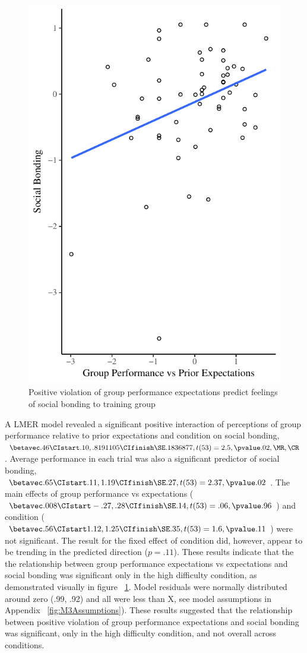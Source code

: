 
\begin{figure}
  \centering
  \includegraphics[width=0.5\linewidth,keepaspectratio] {images/groupPerfExpBondConditionScatter}
  \caption{Positive violation of group performance expectations
 predict feelings of social bonding to training group}
 \label{fig:groupPerfExpBondConditionScatter}
\end{figure}

A LMER model revealed a significant positive interaction of perceptions of group performance relative to prior expectations and condition on social bonding, $\betavec .46 \CIstart .10, .8191105 \CIfinish \SE .1836877, t(53) = 2.5, \pvalue .02, \MR , \CR $.  Average performance in each trial was also a significant predictor of social bonding, $\betavec .65 \CIstart .11, 1.19 \CIfinish \SE .27, t(53) = 2.37, \pvalue .02$.
The main effects of group performance vs expectations ($\betavec .008 \CIstart -.27, .28 \CIfinish \SE .14, t(53) = .06, \pvalue .96$) and condition ($\betavec .56 \CIstart 1.12, 1.25 \CIfinish \SE .35, t(53) = 1.6, \pvalue .11$) were not significant. The result for the fixed effect of condition did, however, appear to be trending in the predicted direction ($p = .11$). These results indicate that the the relationship between group performance expectations vs expectations and social bonding was significant only in the high difficulty condition, as demonstrated visually in figure ~\ref{fig:groupPerfExpBondConditionScatter}.  Model residuals were normally distributed around zero (\resdist .99, \pvalue .92) and all \cooksD were less than X, see model assumptions in Appendix  ~\ref{fig:M3Assumptions}).  These results suggested that the relationship between positive violation of group performance expectations and social bonding was significant, only in the high difficulty condition, and not overall across conditions.









